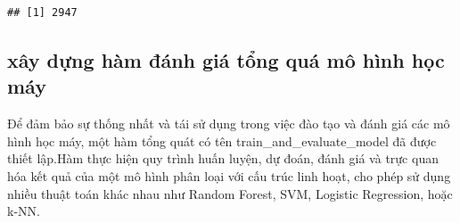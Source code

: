 \documentclass[
]{article}
\begin{document}
\begin{verbatim}
## [1] 2947
\end{verbatim}

\subsection{xây dựng hàm đánh giá tổng quá mô hình học
máy}\label{xuxe2y-dux1ef1ng-huxe0m-ux111uxe1nh-giuxe1-tux1ed5ng-quuxe1-muxf4-huxecnh-hux1ecdc-muxe1y}

Để đảm bảo sự thống nhất và tái sử dụng trong việc đào tạo và đánh giá
các mô hình học máy, một hàm tổng quát có tên
train\_and\_evaluate\_model đã được thiết lập.Hàm thực hiện quy trình
huấn luyện, dự đoán, đánh giá và trực quan hóa kết quả của một mô hình
phân loại với cấu trúc linh hoạt, cho phép sử dụng nhiều thuật toán khác
nhau như Random Forest, SVM, Logistic Regression, hoặc k-NN.
\end{document}
